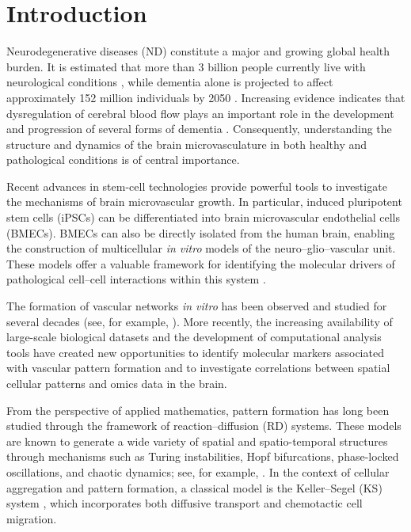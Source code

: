 \documentclass[final,1p,times]{elsarticle}
\begin{document}
\section{Introduction}
Neurodegenerative diseases (ND) constitute a major and growing global health burden. It is estimated that more than 3 billion people currently live with neurological conditions \cite{Ste2024}, while dementia alone is projected to affect approximately 152 million individuals by 2050 \cite{Nich2022}. Increasing evidence indicates that dysregulation of cerebral blood flow plays an important role in the development and progression of several forms of dementia \cite{Win2024,Owe2024,Tor2024,Zhu2022}. Consequently, understanding the structure and dynamics of the brain microvasculature in both healthy and pathological conditions is of central importance.


Recent advances in stem-cell technologies provide powerful tools to investigate the mechanisms of brain microvascular growth. In particular, induced pluripotent stem cells (iPSCs) can be differentiated into brain microvascular endothelial cells (BMECs). BMECs can also be directly isolated from the human brain, enabling the construction of multicellular \textit{in vitro} models of the neuro–glio–vascular unit. These models offer a valuable framework for identifying the molecular drivers of pathological cell–cell interactions within this system \cite{Elahi2023}.




The formation of vascular networks \textit{ in vitro} has been observed and studied for several decades (see, for example, \cite{Good2007}). More recently, the increasing availability of large-scale biological datasets and the development of computational analysis tools have created new opportunities to identify molecular markers associated with vascular pattern formation and to investigate correlations between spatial cellular patterns and omics data in the brain.

From the perspective of applied mathematics, pattern formation has long been studied through the framework of reaction–diffusion (RD) systems. These models are known to generate a wide variety of spatial and spatio-temporal structures through mechanisms such as Turing instabilities, Hopf bifurcations, phase-locked oscillations, and chaotic dynamics; see, for example, \cite{Murray,Turing,Amb-2012,Amb-2016}. In the context of cellular aggregation and pattern formation, a classical model is the Keller–Segel (KS) system \cite{Kel1971}, which incorporates both diffusive transport and chemotactic cell migration.
\end{document}
